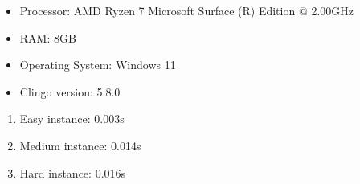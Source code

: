 \documentclass[11pt]{article}
\begin{document}
\begin{itemize}
  \item Processor: AMD Ryzen 7 Microsoft Surface (R) Edition @ 2.00GHz
  \item RAM: 8GB
  \item Operating System: Windows 11
  \item Clingo version: 5.8.0
\end{itemize}

\begin{enumerate}
  \item Easy instance: 0.003s
  \item Medium instance: 0.014s
  \item Hard instance: 0.016s
\end{enumerate}



\newpage
\end{document}

